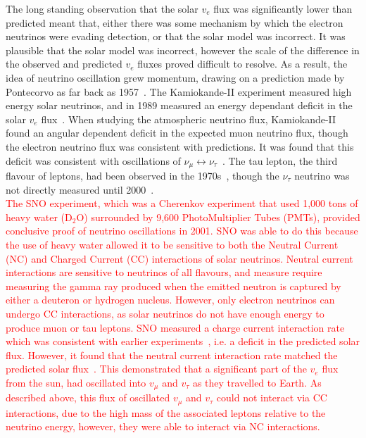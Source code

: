 The long standing observation that the solar $v_{e}$ flux was significantly lower than predicted meant that, either there was some mechanism by which the electron neutrinos were evading detection, or that the solar model was incorrect. It was plausible that the solar model was incorrect, however the scale of the difference in the observed and predicted $v_{e}$ fluxes proved difficult to resolve. As a result, the idea of neutrino oscillation grew momentum, drawing on a prediction made by Pontecorvo as far back as 1957~\citep{Pontecorvo1957}. The Kamiokande-II experiment measured high energy solar neutrinos, and in 1989 measured an energy dependant deficit in the solar $v_{e}$ flux~\citep{PhysRevLett.63.16}. When studying the atmospheric neutrino flux, Kamiokande-II found an angular dependent deficit in the expected muon neutrino flux, though the electron neutrino flux was consistent with predictions. It was found that this deficit was consistent with oscillations of $\nu_{\mu} \leftrightarrow \nu_{\tau}$~\citep{PhysRevLett.81.1562}. The tau lepton, the third flavour of leptons, had been observed in the 1970s~\citep{PhysRevLett.35.1489}, though the $\nu_{\tau}$ neutrino was not directly measured until 2000~\citep{Kodama2001218}. \\

\textcolor{red}{The SNO experiment, which was a Cherenkov experiment that used 1,000 tons of heavy water (D$_{2}$O) surrounded by 9,600 PhotoMultiplier Tubes (PMTs), provided conclusive proof of neutrino oscillations in 2001. SNO was able to do this because the use of heavy water allowed it to be sensitive to both the Neutral Current (NC) and Charged Current (CC) interactions of solar neutrinos. Neutral current interactions are sensitive to neutrinos of all flavours, and measure require measuring the gamma ray produced when the emitted neutron is captured by either a deuteron or hydrogen nucleus. However, only electron neutrinos can undergo CC interactions, as solar neutrinos do not have enough energy to produce muon or tau leptons. SNO measured a charge current interaction rate which was consistent with earlier experiments~\citep{Ahmad:2001an}, i.e. a deficit in the predicted solar flux. However, it found that the neutral current interaction rate matched the predicted solar flux~\citep{PhysRevLett.89.011301}. This demonstrated that a significant part of the $v_{e}$ flux from the sun, had oscillated into $v_{\mu}$ and $v_{\tau}$ as they travelled to Earth. As described above, this flux of oscillated $v_{\mu}$ and $v_{\tau}$ could not interact via CC interactions, due to the high mass of the associated leptons relative to the neutrino energy, however, they were able to interact via NC interactions.} \\

